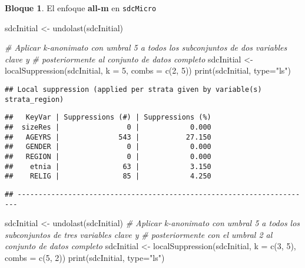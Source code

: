 \documentclass[
]{book}
\newenvironment{Shaded}{\begin{snugshade}}{\end{snugshade}}
\newcommand{\AttributeTok}[1]{\textcolor[rgb]{0.77,0.63,0.00}{#1}}
\newcommand{\CommentTok}[1]{\textcolor[rgb]{0.56,0.35,0.01}{\textit{#1}}}
\newcommand{\DecValTok}[1]{\textcolor[rgb]{0.00,0.00,0.81}{#1}}
\newcommand{\FunctionTok}[1]{\textcolor[rgb]{0.00,0.00,0.00}{#1}}
\newcommand{\NormalTok}[1]{#1}
\newcommand{\OtherTok}[1]{\textcolor[rgb]{0.56,0.35,0.01}{#1}}
\newcommand{\StringTok}[1]{\textcolor[rgb]{0.31,0.60,0.02}{#1}}
\theoremstyle{definition}
\theoremstyle{definition}
\newtheorem{example}{Bloque}[chapter]
\theoremstyle{definition}
\theoremstyle{definition}
\theoremstyle{remark}
\begin{document}
\begin{example}
\protect\hypertarget{exm:bloque22jgm}{}\label{exm:bloque22jgm}El enfoque \textbf{all-m} en \texttt{sdcMicro}
\end{example}

\begin{Shaded}
\begin{Highlighting}[]
\NormalTok{sdcInitial }\OtherTok{\textless{}{-}} \FunctionTok{undolast}\NormalTok{(sdcInitial)}

\CommentTok{\# Aplicar k{-}anonimato con umbral 5 a todos los subconjuntos de dos variables clave y}
\CommentTok{\# posteriormente al conjunto de datos completo}
\NormalTok{sdcInitial }\OtherTok{\textless{}{-}} \FunctionTok{localSuppression}\NormalTok{(sdcInitial, }\AttributeTok{k =} \DecValTok{5}\NormalTok{, }\AttributeTok{combs =} \FunctionTok{c}\NormalTok{(}\DecValTok{2}\NormalTok{, }\DecValTok{5}\NormalTok{))}
\FunctionTok{print}\NormalTok{(sdcInitial, }\AttributeTok{type=}\StringTok{"ls"}\NormalTok{)}
\end{Highlighting}
\end{Shaded}

\begin{verbatim}
## Local suppression (applied per strata given by variable(s) strata_region)
\end{verbatim}

\begin{verbatim}
##   KeyVar | Suppressions (#) | Suppressions (%)
##  sizeRes |                0 |            0.000
##   AGEYRS |              543 |           27.150
##   GENDER |                0 |            0.000
##   REGION |                0 |            0.000
##    etnia |               63 |            3.150
##    RELIG |               85 |            4.250
\end{verbatim}

\begin{verbatim}
## ----------------------------------------------------------------------
\end{verbatim}

\begin{Shaded}
\begin{Highlighting}[]
\NormalTok{sdcInitial }\OtherTok{\textless{}{-}} \FunctionTok{undolast}\NormalTok{(sdcInitial)}
\CommentTok{\# Aplicar k{-}anonimato con umbral 5 a todos los subconjuntos de tres variables clave y}
\CommentTok{\# posteriormente con el umbral 2 al conjunto de datos completo}
\NormalTok{sdcInitial }\OtherTok{\textless{}{-}} \FunctionTok{localSuppression}\NormalTok{(sdcInitial, }\AttributeTok{k =} \FunctionTok{c}\NormalTok{(}\DecValTok{3}\NormalTok{, }\DecValTok{5}\NormalTok{), }\AttributeTok{combs =} \FunctionTok{c}\NormalTok{(}\DecValTok{5}\NormalTok{, }\DecValTok{2}\NormalTok{))}
\FunctionTok{print}\NormalTok{(sdcInitial, }\AttributeTok{type=}\StringTok{"ls"}\NormalTok{)}
\end{Highlighting}
\end{Shaded}
\end{document}
